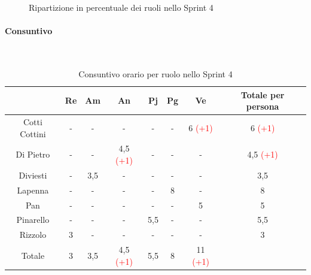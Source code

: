 \documentclass{article}
\begin{document}
                \begin{figure}[H]
                    \centering
                    \caption{Ripartizione in percentuale dei ruoli nello Sprint 4}
                \end{figure}


                \paragraph{Consuntivo}\mbox{}\\
                \begin{table}[H]
                    \centering
                    \begin{tabular}{|c|c|c|c|c|c|c|c|}
                    \hline
                                & Re  & Am  & An  & Pj  & Pg  & Ve  & Totale per persona \\ \hline
                    Cotti Cottini & -   & -   & -   & -   & -   & 6 \textcolor{red}{(+1)}  & 6 \textcolor{red}{(+1)}                 \\ \hline
                    Di Pietro     & -   & -   & 4,5 \textcolor{red}{(+1)} & -   & -   & -   & 4,5 \textcolor{red}{(+1)}               \\ \hline
                    Diviesti      & -   & 3,5 & -   & -   & -   & -   & 3,5                \\ \hline
                    Lapenna       & -   & -   & -   & -   & 8  & -   & 8                 \\ \hline
                    Pan           & -   & -   & -   & -   & -   & 5   & 5                  \\ \hline
                    Pinarello     & -   & -   & -   & 5,5 & -   & -   & 5,5                \\ \hline
                    Rizzolo       & 3   & -   & -   & -   & -   & -   & 3                  \\ \hline
                    Totale        & 3   & 3,5 & 4,5 \textcolor{red}{(+1)} & 5,5 & 8  & 11 \textcolor{red}{(+1)}  &                    \\ \hline
                    \end{tabular}
                    \caption{Consuntivo orario per ruolo nello Sprint 4}
                \end{table}
\end{document}
